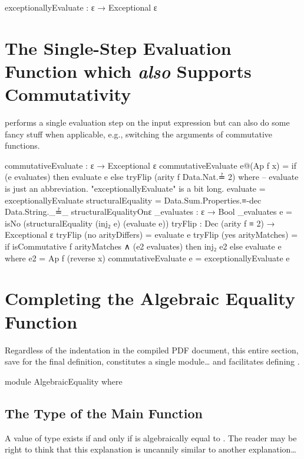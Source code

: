 \documentclass{report}
\begin{document}
\begin{code}
exceptionallyEvaluate : ε → Exceptional ε
\end{code}

\section{The Single-Step Evaluation Function which \emph{also} Supports Commutativity}
  performs a single evaluation step on the input expression but can also do some fancy stuff when applicable, e.g., switching the arguments of commutative functions.

\begin{code}
commutativeEvaluate : ε → Exceptional ε
commutativeEvaluate e@(Ap f x) =
  if (e evaluates) then evaluate e else tryFlip (arity f Data.Nat.≟ 2)
  where
  -- evaluate is just an abbreviation.  "exceptionallyEvaluate" is a bit long.
  evaluate = exceptionallyEvaluate
  structuralEquality =
    Data.Sum.Properties.≡-dec Data.String._≟_ structuralEqualityOnε
  _evaluates : ε → Bool
  _evaluates e = isNo (structuralEquality (inj₂ e) (evaluate e))
  tryFlip : Dec (arity f ≡ 2) → Exceptional ε
  tryFlip (no arityDiffers) = evaluate e
  tryFlip (yes arityMatches) =
    if isCommutative f arityMatches ∧ (e2 evaluates) then inj₂ e2 else evaluate e
    where e2 = Ap f (reverse x)
commutativeEvaluate e = exceptionallyEvaluate e
\end{code}

\section{Completing the Algebraic Equality Function}
Regardless of the indentation in the compiled PDF document, this entire section, save for the final definition, constitutes a single module\ldots{} and facilitates defining .

\begin{code}
module AlgebraicEquality where
\end{code}

\subsection{The Type of the Main Function}
A value of type    exists if and only if  is algebraically equal to .  The reader may be right to think that this explanation is uncannily similar to another explanation\ldots{}
\end{document}

